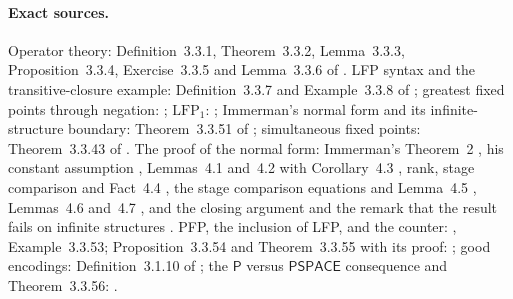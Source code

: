 \paragraph{Exact sources.} Operator theory: Definition~3.3.1,
Theorem~3.3.2, Lemma~3.3.3, Proposition~3.3.4, Exercise~3.3.5 and
Lemma~3.3.6 of \cite[pp.~153--155]{Gradel2007FMTDescriptiveChapter}. LFP syntax and the
transitive-closure example: Definition~3.3.7 and Example~3.3.8 of
\cite[p.~155]{Gradel2007FMTDescriptiveChapter}; greatest fixed points through negation:
\cite[p.~156]{Gradel2007FMTDescriptiveChapter}; \(\mathrm{LFP}_1\):
\cite[p.~173]{Gradel2007FMTDescriptiveChapter}; Immerman's normal form and its
infinite-structure boundary: Theorem~3.3.51 of
\cite[p.~176]{Gradel2007FMTDescriptiveChapter}; simultaneous fixed points:
Theorem~3.3.43 of \cite[p.~174]{Gradel2007FMTDescriptiveChapter}. The proof of the normal
form: Immerman's Theorem~2 \cite[pp.~87, 94]{Immerman1986}, his constant
assumption \cite[p.~89]{Immerman1986}, Lemmas~4.1 and~4.2 with
Corollary~4.3 \cite[pp.~95--97]{Immerman1986}, rank, stage comparison and
Fact~4.4 \cite[p.~97]{Immerman1986}, the stage comparison equations and
Lemma~4.5 \cite[p.~98]{Immerman1986}, Lemmas~4.6 and~4.7
\cite[pp.~98--99]{Immerman1986}, and the closing argument and the remark
that the result fails on infinite structures
\cite[p.~100]{Immerman1986}. PFP, the inclusion of LFP, and the
counter: \cite[pp.~177--178]{Gradel2007FMTDescriptiveChapter}, Example~3.3.53;
Proposition~3.3.54 and Theorem~3.3.55 with its proof:
\cite[pp.~178--179]{Gradel2007FMTDescriptiveChapter}; good encodings:
Definition~3.1.10 of \cite[p.~136]{Gradel2007FMTDescriptiveChapter}; the
\(\mathsf P\) versus \(\mathsf{PSPACE}\) consequence and
Theorem~3.3.56: \cite[p.~180]{Gradel2007FMTDescriptiveChapter}.
